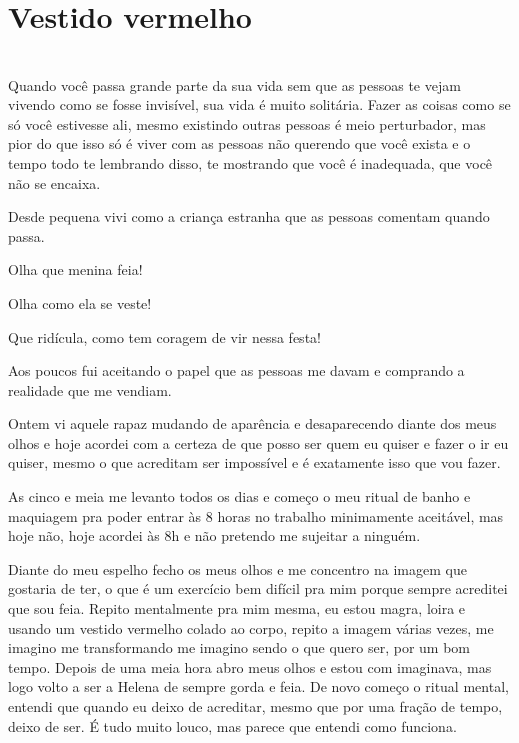 
\newpage


\ifdefined\useChapters
\chapter{Vestido vermelho}
\else
\chapter{}
\fi

Quando você passa grande parte da sua vida sem que as pessoas te vejam vivendo como se fosse invisível, sua vida é muito solitária. Fazer as coisas como se só você estivesse ali, mesmo existindo outras pessoas é meio perturbador, mas pior do que isso só é viver com as pessoas não querendo que você exista e o tempo todo te lembrando disso, te mostrando que você é inadequada, que você não se encaixa.

Desde pequena vivi como a criança estranha que as pessoas comentam quando passa. 

Olha que menina feia!

Olha como ela se veste!

Que ridícula, como tem coragem de vir nessa festa!

Aos poucos fui aceitando o papel que as pessoas me davam e comprando a realidade que me vendiam.

Ontem vi aquele rapaz mudando de aparência e desaparecendo diante dos meus olhos e hoje acordei com a certeza de que posso ser quem eu quiser e fazer o ir eu quiser, mesmo o que acreditam ser impossível e é exatamente isso que vou fazer.

As cinco e meia me levanto todos os dias e começo o meu ritual de banho e maquiagem pra poder entrar às 8 horas no trabalho minimamente aceitável, mas hoje não, hoje acordei às 8h e não pretendo me sujeitar a ninguém.

Diante do meu espelho fecho os meus olhos e me concentro na imagem que gostaria de ter, o que é um exercício bem difícil pra mim porque sempre acreditei que sou feia. Repito mentalmente pra mim mesma, eu estou magra, loira e usando um vestido vermelho colado ao corpo, repito a imagem várias vezes, me imagino me transformando me imagino sendo o que quero ser, por um bom tempo. Depois de uma meia hora abro meus olhos e estou com imaginava, mas logo volto a ser a Helena de sempre gorda e feia. De novo começo o ritual mental, entendi que quando eu deixo de acreditar, mesmo que por uma fração de tempo, deixo de ser. É tudo muito louco, mas parece que entendi como funciona.

